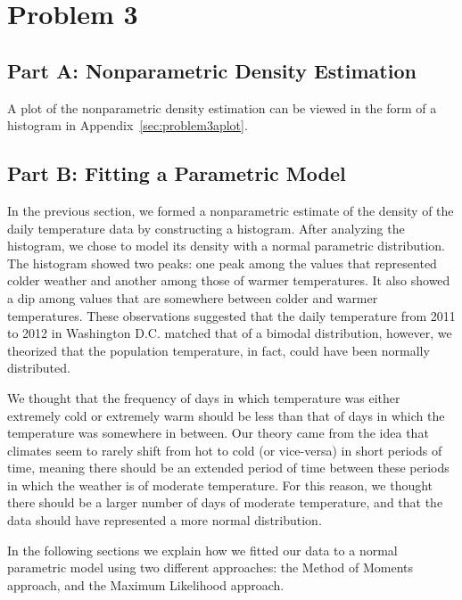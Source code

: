 \documentclass[11pt]{article}
\begin{document}
\pagebreak

\section{Problem 3}
\label{sec:problem3}
\subsection{Part A: Nonparametric Density Estimation}
\label{subsec:3a}
A plot of the nonparametric density estimation can be viewed in the form of a histogram in Appendix~\ref{sec:problem3aplot}.

\subsection{Part B: Fitting a Parametric Model}
\label{subsec:3b}
In the previous section, we formed a nonparametric estimate of the density of the daily temperature data by constructing a histogram. After analyzing the histogram, we chose to model its density with a normal parametric distribution. The histogram showed two peaks: one peak among the values that represented colder weather and another among those of warmer temperatures. It also showed a dip among values that are somewhere between colder and warmer temperatures. These observations suggested that the daily temperature from 2011 to 2012 in Washington D.C. matched that of a bimodal distribution, however, we theorized that the population temperature, in fact, could have been normally distributed.  

We thought that the frequency of days in which temperature was either extremely cold or extremely warm should be less than that of days in which the temperature was somewhere in between. Our theory came from the idea that climates seem to rarely shift from hot to cold (or vice-versa) in short periods of time, meaning there should be an extended period of time between these periods in which the weather is of moderate temperature. For this reason, we thought there should be a larger number of days of moderate temperature, and that the data should have represented a more normal distribution. 

In the following sections we explain how we fitted our data to a normal parametric model using two different approaches: the Method of Moments approach, and the Maximum Likelihood approach. 
\end{document}
